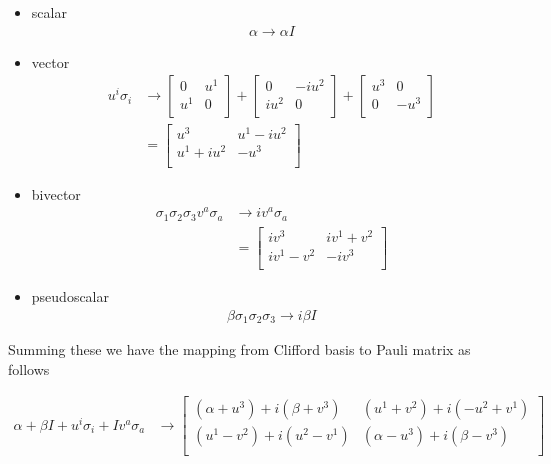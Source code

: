 \documentclass{article}
\begin{document}
\begin{itemize}
\item scalar
\begin{align*}
\alpha \rightarrow \alpha I
\end{align*}

\item vector
\begin{align*}
u^i \sigma_i &\rightarrow 
\begin{bmatrix}
0 & u^1 \\
u^1 & 0 \\
\end{bmatrix}
+
\begin{bmatrix}
0 & -i u^2 \\
i u^2 & 0 \\
\end{bmatrix}
+
\begin{bmatrix}
u^3 & 0 \\
0 & -u^3 \\
\end{bmatrix} \\
&=
\begin{bmatrix}
u^3 & u^1 -i u^2 \\
u^1 + i u^2 & -u^3 \\
\end{bmatrix}
\end{align*}

\item bivector
\begin{align*}
\sigma_1\sigma_2\sigma_3 v^a \sigma_a &\rightarrow i v^a \sigma_a \\
&= \begin{bmatrix}
iv^3 & iv^1 + v^2 \\
iv^1 - v^2 & -i v^3 \\
\end{bmatrix}
\end{align*}
\item pseudoscalar
\begin{align*}
\beta \sigma_1\sigma_2\sigma_3 \rightarrow i \beta I
\end{align*}
\end{itemize}

Summing these we have the mapping from Clifford basis to Pauli matrix as
follows

\begin{align*}
\alpha + \beta I
+ u^i \sigma_i
+ I v^a \sigma_a 
&\rightarrow 
\begin{bmatrix}
(\alpha + u^3) + i(\beta + v^3) & (u^1 + v^2) +i (-u^2 + v^1) \\
(u^1 - v^2) + i (u^2 - v^1) & (\alpha -u^3) + i(\beta - v^3)\\
\end{bmatrix}
\end{align*}
\end{document}
